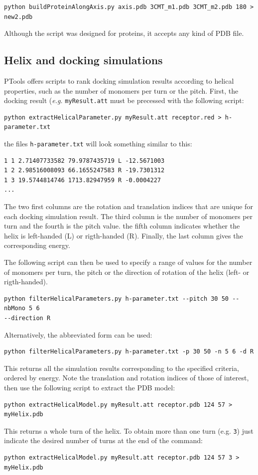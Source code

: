 \documentclass[12pt,a4paper]{article}
\begin{document}
\begin{verbatim}
python buildProteinAlongAxis.py axis.pdb 3CMT_m1.pdb 3CMT_m2.pdb 180 > new2.pdb
\end{verbatim}

Although the script was designed for proteins, it accepts any kind of PDB file.

\subsection{Helix and docking simulations}

PTools offers scripts to rank docking simulation results according to helical properties, such as the number of monomers per turn or the pitch. First, the docking result (\textit{e.g.} \texttt{myResult.att} must be precessed with the following script:
\begin{verbatim}
python extractHelicalParameter.py myResult.att receptor.red > h-parameter.txt
\end{verbatim}

the files \texttt{h-parameter.txt} will look something similar to this:
\begin{verbatim}
1 1 2.71407733582 79.9787435719 L -12.5671003
1 2 2.98516008093 66.1655247583 R -19.7301312
1 3 19.5744814746 1713.82947959 R -0.0004227
...
\end{verbatim}
The two first columns are the rotation and translation indices that are unique for each docking simulation result. The third column is the number of monomers per turn and the fourth is the pitch value. the fifth column indicates whether the helix is left-handed (L) or rigth-handed (R). Finally, the last column gives the corresponding energy.
  
The following script can then be used to specify a range of values for the number of monomers per turn, the pitch or the direction of rotation of the helix (left- or rigth-handed).
\begin{verbatim}
python filterHelicalParameters.py h-parameter.txt --pitch 30 50 --nbMono 5 6 
--direction R
\end{verbatim}

Alternatively, the abbreviated form can be used:
\begin{verbatim}
python filterHelicalParameters.py h-parameter.txt -p 30 50 -n 5 6 -d R
\end{verbatim}

This returns all the simulation results corresponding to the specified criteria, ordered by energy. Note the translation and rotation indices of those of interest, then use the following script to extract the PDB model:
\begin{verbatim} 
python extractHelicalModel.py myResult.att receptor.pdb 124 57 > myHelix.pdb 
\end{verbatim}
This returns a whole turn of the helix. To obtain more than one turn (e.g. \texttt{3}) just indicate the desired number of turns at the end of the command:
\begin{verbatim} 
python extractHelicalModel.py myResult.att receptor.pdb 124 57 3 > myHelix.pdb 
\end{verbatim}
\end{document}
